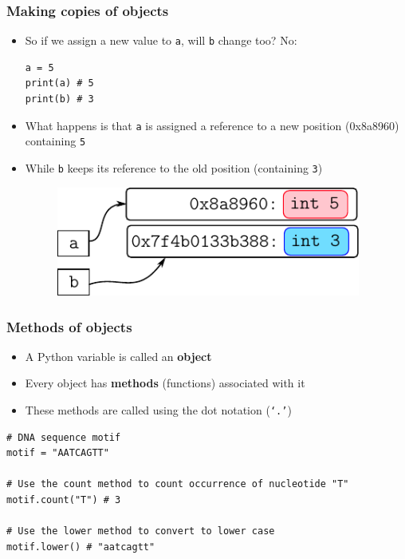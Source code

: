 \documentclass[xcolor=table]{beamer}
\begin{document}
\begin{frame}[fragile]
\frametitle{Making copies of objects}
    \begin{itemize} 
        \item So if we assign a new value to \texttt{a}, will \texttt{b} change too? No:
\begin{lstlisting}[style=python,belowskip=-0.8\baselineskip]
a = 5
print(a) # 5
print(b) # 3
\end{lstlisting} \pause
        \item What happens is that \texttt{a} is assigned a reference to a new position (0x8a8960) containing \texttt{5}
        \item While \texttt{b} keeps its reference to the old position (containing \texttt{3}) \pause
            \begin{figure}\centering%
                \includegraphics[width = 100mm]{variable_assignment2.pdf}
            \end{figure}
    \end{itemize}
\end{frame}

\begin{frame}[fragile]
\frametitle{Methods of objects}

\begin{itemize}\addtolength{\itemsep}{0.5\baselineskip}
	\item A Python variable is called an \textbf{object}
	\item Every object has \textbf{methods} (functions) associated with it
	\item These methods are called using the dot notation (\texttt{`.'})
\end{itemize}
\begin{lstlisting}[style=python]
# DNA sequence motif
motif = "AATCAGTT"

# Use the count method to count occurrence of nucleotide "T" 
motif.count("T") # 3

# Use the lower method to convert to lower case
motif.lower() # "aatcagtt"
\end{lstlisting} 
\end{frame}
\end{document}
